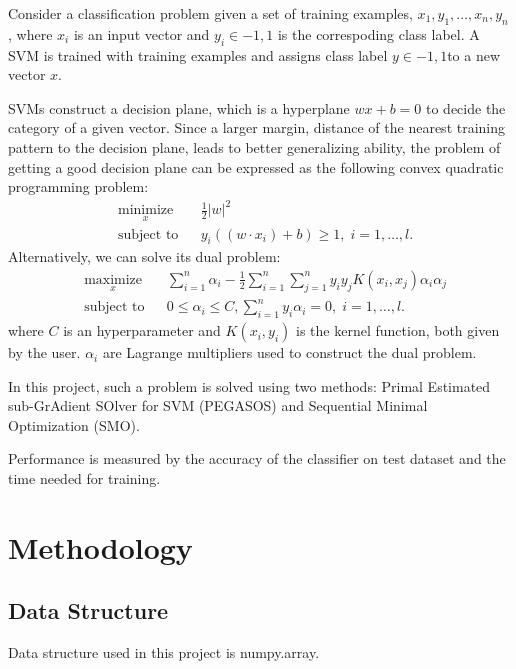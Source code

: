 \documentclass[conference]{IEEEtran}
\begin{document}
    Consider a classification problem given a set of training examples, ${x_1,y_1},\ldots,{x_n,y_n}$, where $x_i$ is an input vector and $y_i \in {-1,1}$ is the correspoding class label. A SVM is trained with training examples and assigns class label $y\in{-1,1}$to a new vector $x$.


    SVMs construct a decision plane, which is a hyperplane $wx+b=0$ to decide the category of a given vector. Since a larger margin, distance of the nearest training pattern to the decision plane, leads to better generalizing ability, the problem of getting a good decision plane can be expressed as the following convex quadratic programming problem:
    \begin{equation*}
    \begin{aligned}
    & \underset{x}{\text{minimize}}
    & & \frac{1}{2}\left|w\right|^2 \\
    & \text{subject to}
    & & y_i((w\cdot x_i)+b)\geq 1, \; i = 1, \ldots, l.
    \end{aligned}
    \end{equation*}
    Alternatively, we can solve its dual problem:
    \begin{equation*}
    \begin{aligned}
    & \underset{x}{\text{maximize}}
    & & \sum_{i = 1}^n{\alpha_i} - \frac{1}{2}\sum_{i = 1}^n\sum_{j=1}^n y_iy_jK(x_i,x_j)\alpha_i\alpha_j \\
    & \text{subject to}
    & & 0\leq\alpha_i\leq C,\sum_{i = 1}^ny_i\alpha_i=0, \; i = 1, \ldots, l.
    \end{aligned}
    \end{equation*}
    where $C$ is an hyperparameter and $K(x_i,y_i)$ is the kernel function, both given by the user. $\alpha_i$ are Lagrange multipliers used to construct the dual problem.

    In this project, such a problem is solved using two methods: Primal Estimated sub-GrAdient
    SOlver for SVM (PEGASOS) and Sequential Minimal Optimization (SMO).

    Performance is measured by the accuracy of the classifier on test dataset and the time needed for training.
 

   

    \section{Methodology}
    \subsection{Data Structure}
    Data structure used in this project is numpy.array.
\end{document}
